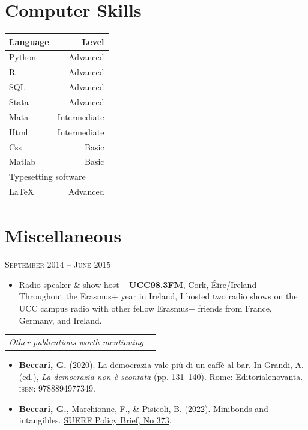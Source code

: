 \documentclass{article}
\begin{document}
\section*{Computer Skills}

\begin{table}[h!]
\centering
\begingroup
\setlength{\tabcolsep}{1cm} %
\begin{tabular}{l r}
Language & Level\\
\hline\hline
Python     &  Advanced\\
R & Advanced\\
SQL & Advanced\\
Stata     & Advanced\\
Mata & Intermediate\\
Html & Intermediate\\
Css & Basic\\
Matlab & Basic\\
\hline
\multicolumn{2}{l}{Typesetting software}\\
{\LaTeX} & Advanced\\
\hline\hline

\end{tabular}
\endgroup
\label{tab:computer}
\end{table}

\section*{Miscellaneous}
\textsc{September} 2014 -- \textsc{June} 2015%
\begin{itemize}
	\item Radio speaker \& show host -- \textbf{UCC98.3FM}, Cork, \'{E}ire/Ireland\\
	Throughout the Erasmus+ year in Ireland, I hosted two radio shows on the UCC campus radio with other fellow Erasmus+ friends from France, Germany, and Ireland.
\end{itemize}
\newpage
\begin{minipage}[l]{0.9\textwidth}
\begin{tabular}{l l}
{\Large\emph{Other publications worth mentioning}}&
\end{tabular}
\end{minipage}
\begin{itemize}
	\item \textbf{Beccari, G.} (2020). \href{https://drive.google.com/file/d/1on9CIfzC1K0_-tm8w6yBHpOwuttn8abH/view?usp=sharing}{La democrazia vale pi\`{u} di un caff\`{e} al bar}. In Grandi, A. (ed.), \textit{La democrazia non \`{e} scontata} (pp. 131--140). Rome: Editorialenovanta. \textsc{isbn:} 9788894977349.
        \item \textbf{Beccari, G.}, Marchionne, F., \& Pisicoli, B. (2022). Minibonds and intangibles. \href{https://www.suerf.org/suer-policy-brief/49131/minibonds-and-intangibles}{SUERF Policy Brief, No 373}.
\end{itemize}
\end{document}
